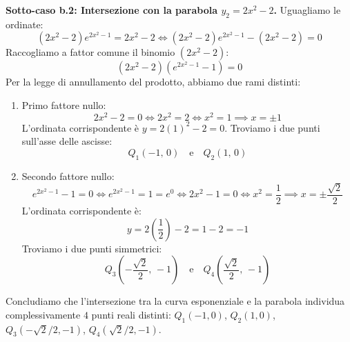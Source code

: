 \documentclass[11pt,a4paper,oneside]{report}
\begin{document}
\begin{dimostrazione}[Svolgimento]
\textbf{Sotto-caso b.2: Intersezione con la parabola $y_2 = 2x^2 - 2$.}
Uguagliamo le ordinate:
\begin{equation*}
    (2x^2 - 2)e^{2x^2 - 1} = 2x^2 - 2 \iff (2x^2 - 2)e^{2x^2 - 1} - (2x^2 - 2) = 0
\end{equation*}
Raccogliamo a fattor comune il binomio $(2x^2 - 2)$:
\begin{equation*}
    (2x^2 - 2)\left(e^{2x^2 - 1} - 1\right) = 0
\end{equation*}
Per la legge di annullamento del prodotto, abbiamo due rami distinti:
\begin{enumerate}[label=\roman*.]
    \item Primo fattore nullo:
    \begin{equation*}
        2x^2 - 2 = 0 \iff 2x^2 = 2 \iff x^2 = 1 \implies x = \pm 1
    \end{equation*}
    L'ordinata corrispondente è $y = 2(1)^2 - 2 = 0$. Troviamo i due punti sull'asse delle ascisse:
    \begin{equation*}
        Q_1(-1, \, 0) \quad \text{e} \quad Q_2(1, \, 0)
    \end{equation*}
    \item Secondo fattore nullo:
    \begin{equation*}
        e^{2x^2 - 1} - 1 = 0 \iff e^{2x^2 - 1} = 1 = e^0 \iff 2x^2 - 1 = 0 \iff x^2 = \frac{1}{2} \implies x = \pm\frac{\sqrt{2}}{2}
    \end{equation*}
    L'ordinata corrispondente è:
    \begin{equation*}
        y = 2\left(\frac{1}{2}\right) - 2 = 1 - 2 = -1
    \end{equation*}
    Troviamo i due punti simmetrici:
    \begin{equation*}
        Q_3\left(-\frac{\sqrt{2}}{2}, \, -1\right) \quad \text{e} \quad Q_4\left(\frac{\sqrt{2}}{2}, \, -1\right)
    \end{equation*}
\end{enumerate}
Concludiamo che l'intersezione tra la curva esponenziale e la parabola individua complessivamente $4$ punti reali distinti: $Q_1(-1, 0)$, $Q_2(1, 0)$, $Q_3(-\sqrt{2}/2, -1)$, $Q_4(\sqrt{2}/2, -1)$.
\end{dimostrazione}


\newpage

\end{document}
